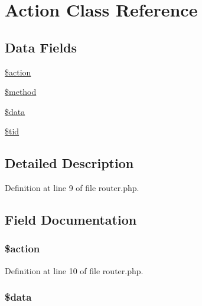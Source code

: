 \hypertarget{class_action}{\section{\-Action \-Class \-Reference}
\label{class_action}
}
\subsection*{\-Data \-Fields}
\begin{DoxyCompactItemize}
\item 
\hyperlink{class_action_aa698a3e72116e8e778be0e95d908ee30}{\$action}
\item 
\hyperlink{class_action_a12661b2fc0f57f97e30a1620889ce9c6}{\$method}
\item 
\hyperlink{class_action_a6efc15b5a2314dd4b5aaa556a375c6d6}{\$data}
\item 
\hyperlink{class_action_a4450bdc73ff7cfb495cb4ec69c98fce8}{\$tid}
\end{DoxyCompactItemize}


\subsection{\-Detailed \-Description}


\-Definition at line 9 of file router.\-php.



\subsection{\-Field \-Documentation}
\hypertarget{class_action_aa698a3e72116e8e778be0e95d908ee30}{
\subsubsection[{\$action}]{\setlength{\rightskip}{0pt plus 5cm}\$action}}\label{class_action_aa698a3e72116e8e778be0e95d908ee30}


\-Definition at line 10 of file router.\-php.

\hypertarget{class_action_a6efc15b5a2314dd4b5aaa556a375c6d6}{
\subsubsection[{\$data}]{\setlength{\rightskip}{0pt plus 5cm}\$data}}\label{class_action_a6efc15b5a2314dd4b5aaa556a375c6d6}


